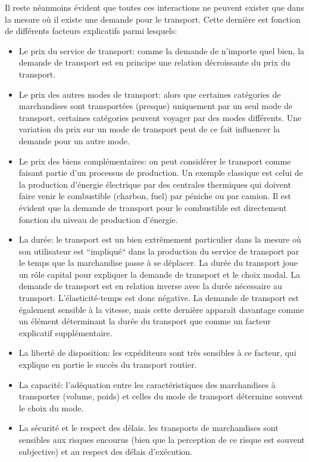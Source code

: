 Il reste néanmoins évident que toutes ces interactions ne peuvent
exister que dans la mesure où il existe une demande pour le
transport. Cette dernière est fonction de différents facteurs
explicatifs parmi lesquels:

\begin{itemize}

\item Le prix du service de transport: comme la demande de n'importe quel
bien, la demande de transport est en principe une relation
décroissante du prix du transport.

\item Le prix des autres modes de transport: alors que certaines catégories
de marchandises sont transportées (presque) uniquement par un seul
mode de transport, certaines catégories peuvent voyager par des
modes différents. Une variation du prix sur un mode de transport
peut de ce fait influencer la demande pour un autre mode.

\item Le prix des biens complémentaires: on peut considérer le transport comme
faisant partie d'un processus de production. Un exemple classique
est celui de la production d'énergie électrique par des centrales
thermiques qui doivent faire venir le combustible (charbon, fuel)
par péniche ou par camion. Il est évident que la demande de
transport pour le combustible est directement fonction du niveau de
production d'énergie.

\item La durée: le transport est un bien extrêmement particulier dans la mesure
où son utilisateur est ``impliqué`` dans la production du service de transport
par le temps que la marchandise passe à se déplacer. La durée du transport joue
un rôle capital pour expliquer la demande de transport et le choix modal. La
demande de transport est en relation inverse avec la durée nécessaire au
transport. L'élasticité-temps est donc négative. La demande de transport est
également sensible à la vitesse, mais cette dernière apparaît davantage comme un
élément déterminant la durée du transport que comme un facteur explicatif
supplémentaire.

\item La liberté de disposition: les expéditeurs sont très sensibles à ce
facteur, qui explique en partie le succès du transport routier.

\item La capacité: l'adéquation entre les caractéristiques des marchandises à
transporter (volume, poids) et celles du mode de transport détermine souvent le
choix du mode.

\item La sécurité et le respect des délais. les transports de marchandises
sont sensibles aux risques encourus (bien que la perception de ce
risque est souvent subjective) et au respect des délais
d'exécution.

\end{itemize}



